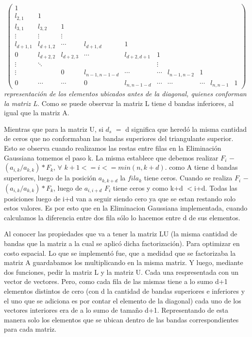 \documentclass[a4paper]{article}
\begin{document}
$$
 \begin{pmatrix}
    1 \\
  l_{2,1} & 1\\
  l_{3,1} & l_{3,2} & 1 \\
  \vdots  & \vdots  & \vdots &  \\
   l_{d+1,1} & l_{d+1, 2} & \cdots & l_{d+1,d} & 1 \\
   0 & l_{d+2, 2} & l_{d+2, 3} & \cdots &l_{d+2,d+1} & 1\\
  \vdots  & \ddots  & &  &  & \vdots  &  \\
  \vdots  &  & 0 & l_{n-1,n-1-d} & \cdots & \cdots & l_{n-1,n-2} & 1 \\
  0 & \cdots & \cdots & 0 & l_{n,n-1-d} & \cdots & \cdots & \cdots & l_{n,n-1} & 1

  
 \end{pmatrix}
$$
\textit{representaci\'on de los elementos ubicados antes de la diagonal, quienes conforman la matriz L. }\newline
Como se puede observar la matriz L tiene d bandas inferiores, al igual que la matriz A. \newline \newline


Mientras que para la matriz U, si $d_s$ $=$ d significa que heredó la misma cantidad de ceros que no conformaban las bandas superiores del triangulante superior. Esto se observa cuando realizamos las restas entre filas en la Eliminación Gaussiana tomemos el paso k. La misma establece que debemos realizar $F_i$ $-$ $(a_{i,k}/a_{k,k})*F_k$, $\forall$ $k+1<= i <= min(n,k+d)$. como A tiene d bandas superiores, luego de la posición $a_{k,k+d}$ la $fila_k$ tiene ceros. Cuando se realiza $F_i$ $-$ $(a_{i,k}/a_{k,k})*F_k$, luego de $a_{i,i+d}$ $F_i$ tiene ceros y como k+d $<$i+d. Todas las posiciones luego de i+d van a seguir siendo cero ya que se estan restando solo estos valores. Es por esto que en la Eliminacion Gaussiana implementada, cuando calculamos la diferencia entre dos fila sólo lo hacemos entre d de sus elementos.       \newline \newline

Al conocer las propiedades que va a tener la matriz LU (la misma cantidad de bandas que la matriz a la cual se aplicó dicha factorización). Para optimizar en costo espacial. Lo que se implementó fue, que a medidad que se factorizaba la matriz A guardabamos los multiplicando en la misma matriz. Y luego, mediante dos funciones, pedir la matriz L y la matriz U. Cada una respresentada con un vector de vectores. Pero, como cada fila de las mismas tiene a lo sumo d+1 elementos distintos de cero (con d la cantidad de bandas superiores e inferiores y el uno que se adiciona es por contar el elemento de la diagonal) cada uno de los vectores interiores era de a lo sumo de tamaño d+1. Representando de esta manera solo los elementos que se ubican dentro de las bandas correspondientes para cada matriz.     
\end{document}
